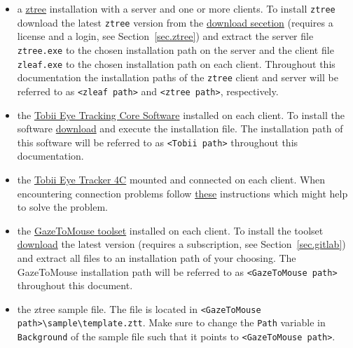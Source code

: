 \documentclass[a4paper,oneside]{book}
\begin{document}
\begin{itemize}
    \item a \href{http://www.ztree.uzh.ch/en.html}{ztree} installation with a server and one or more clients.
        To install \texttt{ztree} download the latest \texttt{ztree} version from the \href{https://www.uzh.ch/ztree/ssl-dir/index.php}{download secetion} (requires a license and a login, see Section~\ref{sec.ztree}) and extract the server file \texttt{ztree.exe} to the chosen installation path on the server and the client file \texttt{zleaf.exe} to the chosen installation path on each client.
        Throughout this documentation the installation paths of the \texttt{ztree} client and server will be referred to as \texttt{<zleaf path>} and \texttt{<ztree path>}, respectively.
    \item the \href{https://tobiigaming.com/getstarted/}{Tobii Eye Tracking Core Software} installed on each client.
        To install the software \href{https://tobiigaming.com/downloadlatest/?bundle=tobii-core}{download} and execute the installation file.
        The installation path of this software will be referred to as \texttt{<Tobii path>} throughout this documentation.
    \item the \href{https://tobiigaming.com/eye-tracker-4c/}{Tobii Eye Tracker 4C} mounted and connected on each client.
        When encountering connection problems follow \href{https://help.tobii.com/hc/en-us/articles/115000432589-Is-your-Eye-Tracker-4C-not-connecting-}{these} instructions which might help to solve the problem.
    \item the \href{http://tpf.fluido.as:10012/TBI/TBI-tobii_eye_tracker_gaze}{GazeToMouse toolset} installed on each client.
        To install the toolset \href{http://tpf.fluido.as:10012/TBI/TBI-tobii_eye_tracker_gaze/blob/master/release}{download} the latest version (requires a subscription, see Section~\ref{sec.gitlab}) and extract all files to an installation path of your choosing.
        The GazeToMouse installation path will be referred to as \texttt{<GazeToMouse path>} throughout this document.
    \item the ztree sample file.
        The file is located in \texttt{<GazeToMouse path>\textbackslash sample\textbackslash template.ztt}.
        Make sure to change the \texttt{Path} variable in \texttt{Background} of the sample file such that it points to \texttt{<GazeToMouse path>}.
\end{itemize}
\end{document}
